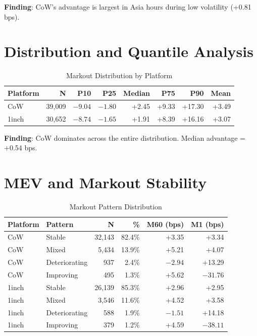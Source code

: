 \documentclass[11pt,a4paper]{article}
\begin{document}
\textbf{Finding}: CoW's advantage is largest in Asia hours during low volatility (+0.81 bps).

\section{Distribution and Quantile Analysis}

\begin{table}[H]
\centering
\caption{Markout Distribution by Platform}
\begin{tabular}{lrrrrrrr}
\toprule
\textbf{Platform} & \textbf{N} & \textbf{P10} & \textbf{P25} & \textbf{Median} & \textbf{P75} & \textbf{P90} & \textbf{Mean} \\
\midrule
CoW & 39,009 & $-9.04$ & $-1.80$ & +2.45 & +9.33 & +17.30 & +3.49 \\
1inch & 30,652 & $-8.74$ & $-1.65$ & +1.91 & +8.39 & +16.16 & +3.07 \\
\bottomrule
\end{tabular}
\end{table}

\textbf{Finding}: CoW dominates across the entire distribution. Median advantage = +0.54 bps.

\section{MEV and Markout Stability}

\begin{table}[H]
\centering
\caption{Markout Pattern Distribution}
\begin{tabular}{llrrrr}
\toprule
\textbf{Platform} & \textbf{Pattern} & \textbf{N} & \textbf{\%} & \textbf{M60 (bps)} & \textbf{M1 (bps)} \\
\midrule
CoW & Stable & 32,143 & 82.4\% & +3.35 & +3.34 \\
CoW & Mixed & 5,434 & 13.9\% & +5.21 & +4.07 \\
CoW & Deteriorating & 937 & 2.4\% & $-2.94$ & +13.29 \\
CoW & Improving & 495 & 1.3\% & +5.62 & $-31.76$ \\
\midrule
1inch & Stable & 26,139 & 85.3\% & +2.96 & +2.95 \\
1inch & Mixed & 3,546 & 11.6\% & +4.52 & +3.58 \\
1inch & Deteriorating & 588 & 1.9\% & $-1.51$ & +14.18 \\
1inch & Improving & 379 & 1.2\% & +4.59 & $-38.11$ \\
\bottomrule
\end{tabular}
\end{table}
\end{document}
